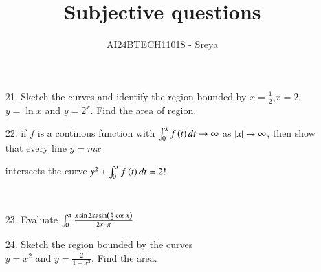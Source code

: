 \documentclass[journal,12pt,twocolumn]{IEEEtran}
\theoremstyle{remark}
\begin{document}

\vspace{3cm}

\title{Subjective questions}
\author{AI24BTECH11018 - Sreya}
\maketitle
\newpage
\bigskip
\begin{enumerate}

    

\renewcommand{\thefigure}{\theenumi}
\renewcommand{\thetable}{\theenumi}
\item[21.] Sketch the curves and identify the region bounded by $x=\frac{1}{2}$,$x=2$,$y=\ln{x}$ and $y=2^x$. Find the area of region.

\hfill{}

\item[22.] if $f$ is a continous function with $\int_{0}^{x}f\left(t\right)dt\rightarrow\infty$ as $\left\vert x\right\vert\rightarrow\infty$, then show that every line $y=mx$\\

intersects the curve $y^2+\int_{0}^{x}f\left(t\right)dt=2!$

\hfill{}\\

\item[23.] Evaluate $\int_{0}^{\pi}\frac{x\sin 2xs\sin \left(\frac{\pi}{2}\cos x\right)}{2x-\pi}$

\hfill{}

\item[24.]  Sketch the region bounded by the curves\\ $y=x^2$ and
$y=\frac{2}{1+x^2}$. Find the area.



\end{enumerate}
\end{document}
